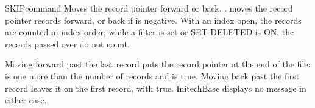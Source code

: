 \begin{XbaseEntry}{SKIP}{command}
Moves the record pointer forward or back.
\Syntax
{}
.
\Usage
{} moves the record pointer  records forward, or back if
 is negative.  With an index open, the records are counted in index
order; while a filter is set or SET DELETED is ON, the records passed over do
not count.

Moving forward past the last record puts the record pointer at the end of the
file:  is one more than the number of records and  is
true.  Moving back past the first record leaves it on the first record, with
 true.  InitechBase displays no message in either case.
\Examples
{}
\end{XbaseEntry}

